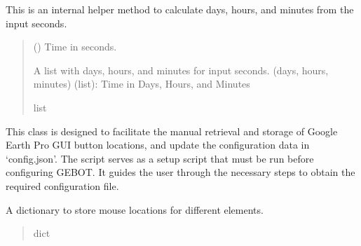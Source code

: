 \documentclass[letterpaper,10pt,english]{sphinxmanual}
\begin{document}
\begin{fulllineitems}
\label{\detokenize{index:gebot.ImageDownloader.__sec2dhm__}}
\pysigstartsignatures
{}
\pysigstopsignatures
\sphinxAtStartPar
This is an internal helper method to calculate days, hours, and minutes from the input seconds.
\begin{quote}\begin{description}
\sphinxAtStartPar
{} () \textendash{} Time in seconds.

\sphinxAtStartPar
A list with days, hours, and minutes for input seconds.
\sphinxhyphen{} (days, hours, minutes) (list): Time in Days, Hours, and Minutes

\sphinxAtStartPar
list

\end{description}\end{quote}

\end{fulllineitems}

\label{\detokenize{index:module-getLoc.LocationGetter}}
\sphinxAtStartPar
{}

\sphinxAtStartPar
This class is designed to facilitate the manual retrieval and storage of Google Earth Pro GUI button locations, and update the configuration data in ‘config.json’.
The script serves as a setup script that must be run before configuring GEBOT. It guides the user through the necessary steps to obtain the required configuration file.
\begin{quote}\begin{description}
\end{description}\end{quote}

\begin{fulllineitems}
\label{\detokenize{index:getLoc.LocationGetter.location_report}}
\pysigstartsignatures
{}
\pysigstopsignatures
\sphinxAtStartPar
A dictionary to store mouse locations for different elements.
\begin{quote}\begin{description}
\sphinxAtStartPar
dict

\end{description}\end{quote}

\end{fulllineitems}
\end{document}

